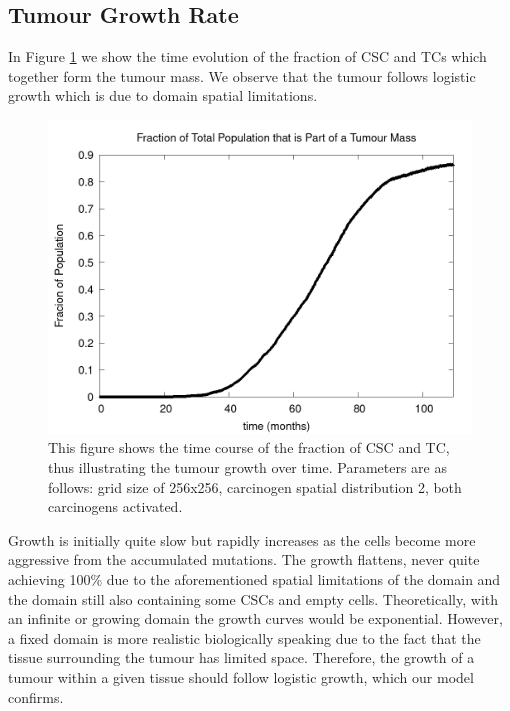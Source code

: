 \documentclass[\main/thesis.tex]{subfiles}
\begin{document}
\subsection{Tumour Growth Rate}
In Figure \ref{fig:GeneralObservations_TumourMassGrowthCurve} we show the time evolution of the fraction of CSC and TCs which together form the tumour mass. We observe that the tumour follows logistic growth which is due to domain spatial limitations.
\begin{figure}[H]
    \centering
    \includegraphics[scale=0.25]{images/2_GeneralObservations/Fig1/numCSCAndTC.png}
    \caption{This figure shows the time course of the fraction of CSC and TC, thus illustrating the tumour growth over time. Parameters are as follows: grid size of 256x256, carcinogen spatial distribution 2, both carcinogens activated.}
    \label{fig:GeneralObservations_TumourMassGrowthCurve}
\end{figure}
Growth is initially quite slow but rapidly increases as the cells become more aggressive from the accumulated mutations. The growth flattens, never quite achieving 100\% due to the aforementioned spatial limitations of the domain and the domain still also containing some CSCs and empty cells. Theoretically, with an infinite or growing domain the growth curves would be exponential. However, a fixed domain is more realistic biologically speaking due to the fact that the tissue  surrounding the tumour has limited space. Therefore, the growth of a tumour within a given tissue should follow logistic growth, which our model confirms. 
\end{document}
